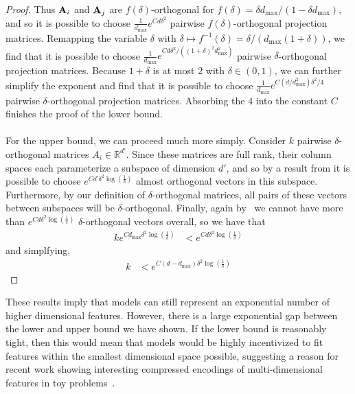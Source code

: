 \documentclass{article} %
\theoremstyle{plain}
\theoremstyle{definition}
\begin{document}
\begin{proof}
Thus ${\mathbf A}_i$ and ${\mathbf A}_j$ are $f(\delta)$-orthogonal for $f(\delta)=\delta d_{\max} / (1-\delta d_{\max})$, and so it is possible to choose $\frac{1}{d_{\max}}e^{C d \delta^2}$ pairwise $f(\delta)$-orthogonal projection matrices. Remapping the variable $\delta$ with $\delta \mapsto f^{-1}(\delta) = \delta/(d_{\max}(1+\delta))$, we find that it is possible to choose $\frac{1}{d_{\max}}e^{C d \delta^2/((1+\delta)^2d_{\max}^2)}$ pairwise $\delta$-orthogonal projection matrices. Because $1+
\delta$ is at most $2$ with $\delta \in (0, 1)$, we can further simplify the exponent and find that it is possible to choose $\frac{1}{d_{\max}}e^{C (d/d_{\max}^2) \delta^2/4}$ pairwise $\delta$-orthogonal projection matrices. Absorbing the $4$ into the constant $C$ finishes the proof of the lower bound.
\\\\
For the upper bound, we can proceed much more simply. Consider $k$ pairwise $\delta$-orthogonal matrices $A_i \in \mathbb{R}^{d'}$. Since these matrices are full rank, their column spaces each parameterize a subspace of dimension $d'$, and so by a result from \citep{alon2003problems} it is possible to choose $e^{Cd’ \delta^2 \log(\frac{1}{\delta})}$ almost orthogonal vectors in this subspace. Furthermore, by our definition of $\delta$-orthogonal matrices, all pairs of these vectors between subspaces will be $\delta$-orthogonal. Finally, again by~\citep{alon2003problems} we cannot have more than $e^{Cd\delta^2\log(\frac{1}{\delta})}$ $\delta$-orthogonal vectors overall, so we have that
\begin{align*}
k e^{C d_{\max} \delta^2 \log(\frac{1}{\delta})} &< e^{Cd\delta^2\log(\frac{1}{\delta})}
\end{align*}
and simplfying,
\begin{align*}
k &< e^{C(d - d_{\max})\delta^2\log(\frac{1}{\delta})} 
\end{align*}



\end{proof}


These results imply that models can still represent an exponential number of higher dimensional features. However, there is a large exponential gap between the lower and upper bound we have shown. If the lower bound is reasonably tight, then this would mean that models would be highly incentivized to fit features within the smallest dimensional space possible, suggesting a reason for recent work showing interesting compressed encodings of multi-dimensional features in toy problems~\citep{circles_theory}.
\end{document}
